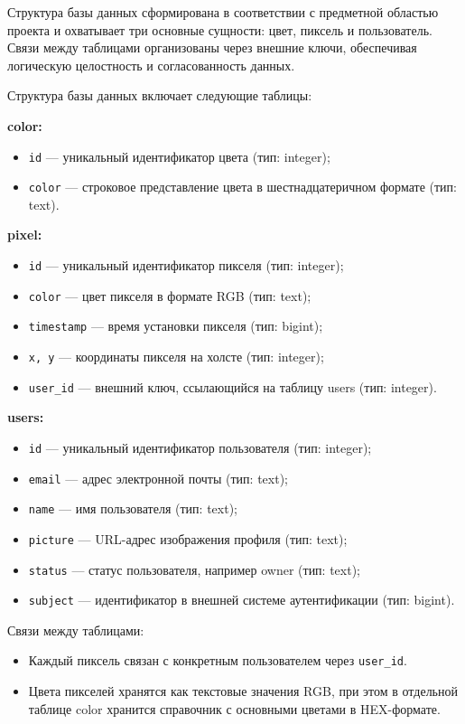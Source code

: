 Структура базы данных сформирована в соответствии с предметной областью проекта и охватывает три основные сущности: цвет, пиксель и пользователь. Связи между таблицами организованы через внешние ключи, обеспечивая логическую целостность и согласованность данных.

Структура базы данных включает следующие таблицы:

\textbf{color:}
\begin{itemize}
    \item \texttt{id} --- уникальный идентификатор цвета (тип: integer);
    \item \texttt{color} --- строковое представление цвета в шестнадцатеричном формате (тип: text).
\end{itemize}

\textbf{pixel:}
\begin{itemize}
    \item \texttt{id} --- уникальный идентификатор пикселя (тип: integer);
    \item \texttt{color} --- цвет пикселя в формате RGB (тип: text);
    \item \texttt{timestamp} --- время установки пикселя (тип: bigint);
    \item \texttt{x, y} --- координаты пикселя на холсте (тип: integer);
    \item \texttt{user\_id} --- внешний ключ, ссылающийся на таблицу users (тип: integer).
\end{itemize}

\textbf{users:}
\begin{itemize}
    \item \texttt{id} --- уникальный идентификатор пользователя (тип: integer);
    \item \texttt{email} --- адрес электронной почты (тип: text);
    \item \texttt{name} --- имя пользователя (тип: text);
    \item \texttt{picture} --- URL-адрес изображения профиля (тип: text);
    \item \texttt{status} --- статус пользователя, например owner (тип: text);
    \item \texttt{subject} --- идентификатор в внешней системе аутентификации (тип: bigint).
\end{itemize}

Связи между таблицами:
\begin{itemize}
    \item Каждый пиксель связан с конкретным пользователем через \texttt{user\_id}.
    \item Цвета пикселей хранятся как текстовые значения RGB, при этом в отдельной таблице color хранится справочник с основными цветами в HEX-формате.
\end{itemize}

